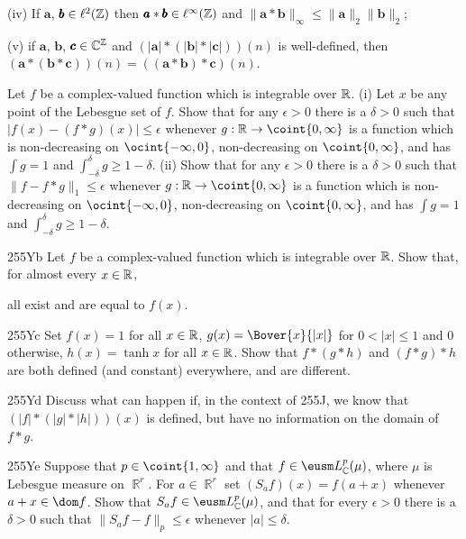 {\quad (iv) If $\pmb{a}$, $\pmb{b}\in\ell^2(\Bbb Z)$ then
$\pmb{a}*\pmb{b}\in\ell^{\infty}(\Bbb Z)$ and
$\|\pmb{a}*\pmb{b}\|_{\infty}\le\|\pmb{a}\|_2\|\pmb{b}\|_2$;

\quad (v) if $\pmb{a}$, $\pmb{b}$, $\pmb{c}\in\Bbb C^{\Bbb Z}$ and
$(|\pmb{a}|*(|\pmb{b}|*|\pmb{c}|))(n)$ is well-defined, then
$(\pmb{a}*(\pmb{b}*\pmb{c}))(n)=((\pmb{a}*\pmb{b})*\pmb{c})(n)$.

Let $f$ be a complex-valued function which is integrable
over $\Bbb R$.   (i) Let $x$ be any point of the Lebesgue set of $f$.
Show that for any $\epsilon>0$ there is a $\delta>0$ such that
$|f(x)-(f*g)(x)|\le\epsilon$ whenever $g:\Bbb R\to\coint{0,\infty}$ is a
function which is non-decreasing on $\ocint{-\infty,0}$, non-decreasing
on $\coint{0,\infty}$, and has $\int g=1$ and
$\int_{-\delta}^{\delta}g\ge 1-\delta$.   (ii) Show that for any
$\epsilon>0$ there is a $\delta>0$ such that $\|f-f*g\|_1\le\epsilon$
whenever $g:\Bbb R\to\coint{0,\infty}$ is a function which is
non-decreasing on $\ocint{-\infty,0}$, non-decreasing on
$\coint{0,\infty}$, and has $\int g=1$ and
$\int_{-\delta}^{\delta}g\ge 1-\delta$.

\spheader 255Yb Let $f$ be a complex-valued function which is integrable
over $\Bbb R$.   Show that, for almost every $x\in\Bbb R$,



\noindent all exist and are equal to $f(x)$.   

\spheader 255Yc
Set $f(x)=1$ for all $x\in\Bbb R$, $g(x)=\Bover{x}{|x|}$
for $0<|x|\le 1$ and $0$ otherwise, $h(x)=\tanh x$ for all $x\in\Bbb R$.
Show that $f*(g*h)$ and $(f*g)*h$ are both defined (and constant)
everywhere, and are different.

\spheader 255Yd Discuss what can happen if, in the context of 255J, we
know that $(|f|*(|g|*|h|))(x)$ is defined, but have no information on
the domain of $f*g$.

\spheader 255Ye Suppose that $p\in\coint{1,\infty}$
and that $f\in\eusm L^p_{\Bbb C}(\mu)$, where $\mu$ is Lebesgue measure
on $\BbbR^r$.   For $a\in\BbbR^r$ set $(S_af)(x)=f(a+x)$ whenever
$a+x\in\dom f$.   Show that $S_af\in\eusm L^p_{\Bbb C}(\mu)$, and that
for every $\epsilon>0$ there is a $\delta>0$ such that
$\|S_af-f\|_p\le\epsilon$ whenever $|a|\le\delta$.

}
